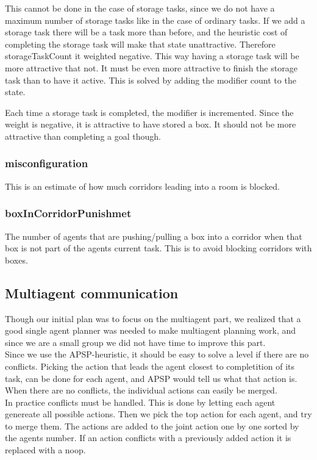 \documentclass[letterpaper]{article}
\begin{document}
This cannot be done in the case of storage tasks, since we do not have a maximum number of
storage tasks like in the case of ordinary tasks. If we add a storage task there will be
a task more than before, and the heuristic cost of completing the storage task will make that
state unattractive. Therefore storageTaskCount it weighted negative. This way having a storage
task will be more attractive that not. It must be even more attractive to finish the storage
task than to have it active. This is solved by adding the modifier count to the state.

Each time a storage task is completed, the modifier is incremented. Since the weight is
negative, it is attractive to have stored a box. It should not be more attractive than
completing a goal though.

\subsubsection{misconfiguration}
This is an estimate of how much corridors leading into a room is blocked.

\subsubsection{boxInCorridorPunishmet}
The number of agents that are pushing/pulling a box into a corridor when that box
is not part of the agents current task. This is to avoid blocking corridors with boxes.

\subsection{Multiagent communication}
Though our initial plan was to focus on the multiagent part, we realized that
a good single agent planner was needed to make multiagent planning work,
and since we are a small group we did not have time to improve this part.\\

Since we use the APSP-heuristic, it should be easy to solve a level if
there are no conflicts. Picking the action that leads
the agent closest to completition of its task, can be done for each agent,
and APSP would tell us what that action is. When there are no conflicts,
the individual actions can easily be merged.\\

In practice conflicts must be handled. This is done by letting each agent
genereate all possible actions. Then we pick the top action for each agent,
and try to merge them. The actions are added to the joint action one by one
sorted by the agents number. If an action conflicts with a previously added
action it is replaced with a noop.\\
\end{document}
